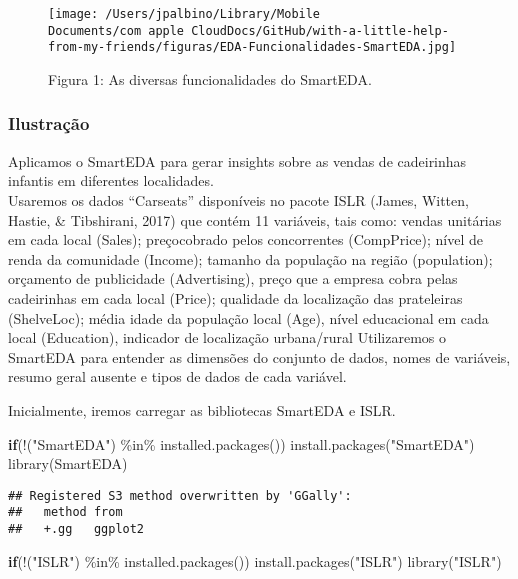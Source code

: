 \documentclass[
]{article}
\newenvironment{Shaded}{\begin{snugshade}}{\end{snugshade}}
\newcommand{\ControlFlowTok}[1]{\textcolor[rgb]{0.13,0.29,0.53}{\textbf{#1}}}
\newcommand{\FunctionTok}[1]{\textcolor[rgb]{0.00,0.00,0.00}{#1}}
\newcommand{\NormalTok}[1]{#1}
\newcommand{\SpecialCharTok}[1]{\textcolor[rgb]{0.00,0.00,0.00}{#1}}
\newcommand{\StringTok}[1]{\textcolor[rgb]{0.31,0.60,0.02}{#1}}
\begin{document}
\begin{figure}
\centering
\texttt{[image: /Users/jpalbino/Library/Mobile Documents/com~apple~CloudDocs/GitHub/with-a-little-help-from-my-friends/figuras/EDA-Funcionalidades-SmartEDA.jpg]}
\caption{Figura 1: As diversas funcionalidades do SmartEDA.}
\end{figure}

\hypertarget{ilustrauxe7uxe3o}{%
\subsubsection{Ilustração}\label{ilustrauxe7uxe3o}}

Aplicamos o SmartEDA para gerar insights sobre as vendas de cadeirinhas
infantis em diferentes localidades.\\
Usaremos os dados ``Carseats'' disponíveis no pacote ISLR (James,
Witten, Hastie, \& Tibshirani, 2017) que contém 11 variáveis, tais como:
vendas unitárias em cada local (Sales); preçocobrado pelos concorrentes
(CompPrice); nível de renda da comunidade (Income); tamanho da população
na região (population); orçamento de publicidade (Advertising), preço
que a empresa cobra pelas cadeirinhas em cada local (Price); qualidade
da localização das prateleiras (ShelveLoc); média idade da população
local (Age), nível educacional em cada local (Education), indicador de
localização urbana/rural Utilizaremos o SmartEDA para entender as
dimensões do conjunto de dados, nomes de variáveis, resumo geral ausente
e tipos de dados de cada variável.

Inicialmente, iremos carregar as bibliotecas SmartEDA e ISLR.

\begin{Shaded}
\begin{Highlighting}[]
\ControlFlowTok{if}\NormalTok{(}\SpecialCharTok{!}\NormalTok{(}\StringTok{"SmartEDA"}\NormalTok{) }\SpecialCharTok{\%in\%} \FunctionTok{installed.packages}\NormalTok{()) }\FunctionTok{install.packages}\NormalTok{(}\StringTok{"SmartEDA"}\NormalTok{)}
\FunctionTok{library}\NormalTok{(SmartEDA)}
\end{Highlighting}
\end{Shaded}

\begin{verbatim}
## Registered S3 method overwritten by 'GGally':
##   method from   
##   +.gg   ggplot2
\end{verbatim}

\begin{Shaded}
\begin{Highlighting}[]
\ControlFlowTok{if}\NormalTok{(}\SpecialCharTok{!}\NormalTok{(}\StringTok{"ISLR"}\NormalTok{) }\SpecialCharTok{\%in\%} \FunctionTok{installed.packages}\NormalTok{()) }\FunctionTok{install.packages}\NormalTok{(}\StringTok{"ISLR"}\NormalTok{)}
\FunctionTok{library}\NormalTok{(}\StringTok{"ISLR"}\NormalTok{)}
\end{Highlighting}
\end{Shaded}
\end{document}
